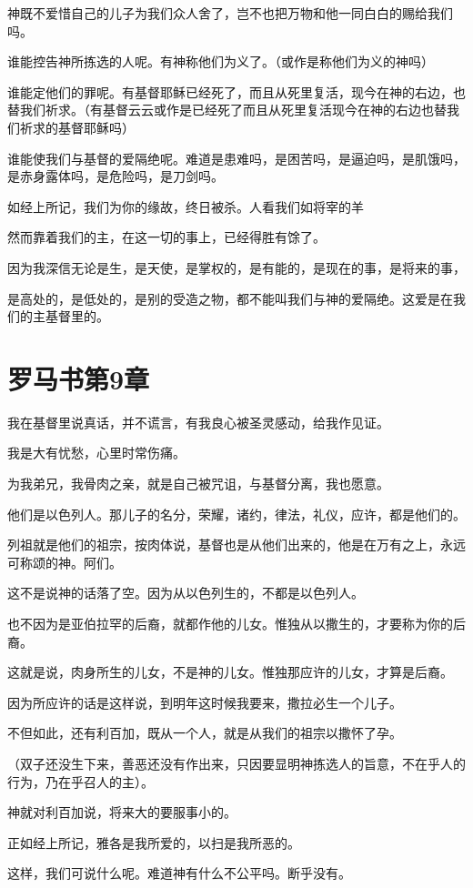 \documentclass[12pt,oneside]{book}
\begin{document}
神既不爱惜自己的儿子为我们众人舍了，岂不也把万物和他一同白白的赐给我们吗。

谁能控告神所拣选的人呢。有神称他们为义了。（或作是称他们为义的神吗）

谁能定他们的罪呢。有基督耶稣已经死了，而且从死里复活，现今在神的右边，也替我们祈求。（有基督云云或作是已经死了而且从死里复活现今在神的右边也替我们祈求的基督耶稣吗）

谁能使我们与基督的爱隔绝呢。难道是患难吗，是困苦吗，是逼迫吗，是肌饿吗，是赤身露体吗，是危险吗，是刀剑吗。

如经上所记，我们为你的缘故，终日被杀。人看我们如将宰的羊

然而靠着我们的主，在这一切的事上，已经得胜有馀了。

因为我深信无论是生，是天使，是掌权的，是有能的，是现在的事，是将来的事，

是高处的，是低处的，是别的受造之物，都不能叫我们与神的爱隔绝。这爱是在我们的主基督里的。

\chapter{罗马书第9章}
我在基督里说真话，并不谎言，有我良心被圣灵感动，给我作见证。

我是大有忧愁，心里时常伤痛。

为我弟兄，我骨肉之亲，就是自己被咒诅，与基督分离，我也愿意。

他们是以色列人。那儿子的名分，荣耀，诸约，律法，礼仪，应许，都是他们的。

列祖就是他们的祖宗，按肉体说，基督也是从他们出来的，他是在万有之上，永远可称颂的神。阿们。

这不是说神的话落了空。因为从以色列生的，不都是以色列人。

也不因为是亚伯拉罕的后裔，就都作他的儿女。惟独从以撒生的，才要称为你的后裔。

这就是说，肉身所生的儿女，不是神的儿女。惟独那应许的儿女，才算是后裔。

因为所应许的话是这样说，到明年这时候我要来，撒拉必生一个儿子。

不但如此，还有利百加，既从一个人，就是从我们的祖宗以撒怀了孕。

（双子还没生下来，善恶还没有作出来，只因要显明神拣选人的旨意，不在乎人的行为，乃在乎召人的主）。

神就对利百加说，将来大的要服事小的。

正如经上所记，雅各是我所爱的，以扫是我所恶的。

这样，我们可说什么呢。难道神有什么不公平吗。断乎没有。
\end{document}
